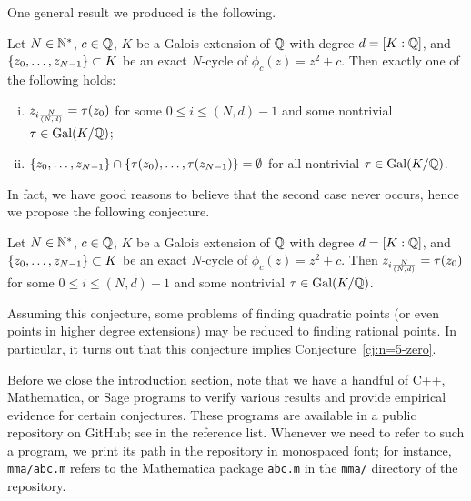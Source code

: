 One general result we produced is the following.

\newcommand{\nd}{\frac{N}{(N, d)}}

\begin{theorem}
  Let $N \in \mathbb{N}^*$, $c \in \mathbb{Q}$, $K$ be a Galois extension of $\mathbb{Q}$ with
  degree $d = [K : \mathbb{Q}]$, and $\left\{z_0, \dots, z_{N-1}\right\} \subset K$ be
  an exact $N$-cycle of $\phi_c(z) = z^2 + c$. Then exactly one of the
  following holds:
  \begin{enumerate}[(i)]
  \item $z_{i\nd} = \t(z_0)$ for some $0 \le i \le (N, d)-1$ and some
    nontrivial $\tau \in \mathrm{Gal}(K/\mathbb{Q})$;

  \item $\left\{z_0, \dots, z_{N-1}\right\} \cap \left\{\tau(z_0), \dots,
      \tau(z_{N-1})\right\} = \emptyset$ for all nontrivial $\tau \in \mathrm{Gal}(K/\mathbb{Q})$.
  \end{enumerate}
\end{theorem}

In fact, we have good reasons to believe that the second case never
occurs, hence we propose the following conjecture.

\begin{conjecture}
  \label{cj:galois-conjugate}
  Let $N \in \mathbb{N}^*$, $c \in \mathbb{Q}$, $K$ be a Galois extension of $\mathbb{Q}$ with
  degree $d = [K : \mathbb{Q}]$, and $\left\{z_0, \dots, z_{N-1}\right\} \subset K$ be
  an exact $N$-cycle of $\phi_c(z) = z^2 + c$. Then $z_{i\nd} =
  \t(z_0)$ for some $0 \le i \le (N, d)-1$ and some nontrivial $\tau \in
  \mathrm{Gal}(K/\mathbb{Q})$.
\end{conjecture}

Assuming this conjecture, some problems of finding quadratic points
(or even points in higher degree extensions) may be reduced to finding
rational points. In particular, it turns out that this conjecture
implies Conjecture~\ref{cj:n=5-zero}.

Before we close the introduction section, note that we have a handful
of C++, Mathematica, or Sage programs to verify various results and
provide empirical evidence for certain conjectures. These programs are
available in a public repository on GitHub; see \cite{src} in the
reference list. Whenever we need to refer to such a program, we print
its path in the repository in monospaced font; for instance,
\texttt{mma/abc.m} refers to the Mathematica package \texttt{abc.m} in
the \texttt{mma/} directory of the repository.

